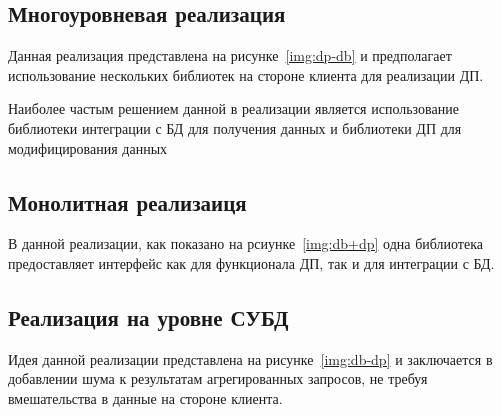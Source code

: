 
\subsection{Многоуровневая реализация}
Данная реализация представлена на рисунке~\ref{img:dp-db} и предполагает использование нескольких библиотек на стороне клиента для реализации ДП.

Наиболее частым решением данной в реализации является использование библиотеки интеграции с БД для получения данных и библиотеки ДП для модифицирования  данных~\cite{main}


\newpage

\subsection{Монолитная реализаиця}
В данной реализации, как показано на рсиунке~\ref{img:db+dp} одна библиотека предоставляет интерфейс как для функционала ДП, так и для интеграции с БД.


\subsection{Реализация на уровне СУБД}
Идея данной реализации представлена на рисунке~\ref{img:db-dp} и заключается в добавлении шума к результатам агрегированных запросов, не требуя вмешательства в данные на стороне клиента.

